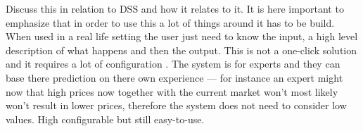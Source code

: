 Discuss this in relation to DSS and how it relates to it. It is here important to emphasize that in order to use this a lot of things around it has to be build. When used in a real life setting the user just need to know the input, a high level description of what happens and then the output.
This is not a one-click solution and it requires a lot of configuration . The system is for experts and they can base there prediction on there own experience --- for instance an expert might now that high prices now together with the current market won't most likely won't result in lower prices, therefore the system does not need to consider low values. High configurable but still easy-to-use.

